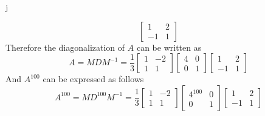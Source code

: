 j\documentclass[12pt]{article}
\begin{document}
\begin{enumerate}
\[\begin{bmatrix}
    1&2\\
    -1&1
\end{bmatrix}
\]
Therefore the diagonalization of $A$ can be written as
\[
A=MDM^{-1}=
\frac{1}{3}
\begin{bmatrix}
    1&-2\\
    1&1
\end{bmatrix}
\begin{bmatrix}
    4&0\\
    0&1
\end{bmatrix}
\begin{bmatrix}
    1&2\\
    -1&1
\end{bmatrix}
\]
And $A^{100}$ can be expressed as follows
\[
A^{100}=MD^{100}M^{-1}=
\frac{1}{3}
\begin{bmatrix}
    1&-2\\
    1&1
\end{bmatrix}
\begin{bmatrix}
    4^{100}&0\\
    0&1
\end{bmatrix}
\begin{bmatrix}
    1&2\\
    -1&1
\end{bmatrix}
\]





\end{enumerate}
\end{document}
